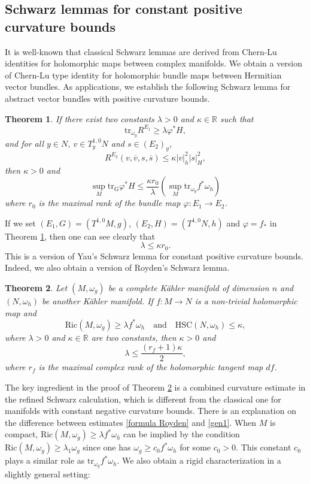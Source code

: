 \documentclass[12pt]{amsart}
\theoremstyle{plain}
\newtheorem{thm}{Theorem}[section]
\theoremstyle{definition}
\newcommand{\btheorem}{\begin{thm}}
\newcommand{\etheorem}{\end{thm}}
\renewcommand{\bar}{\overline}
\renewcommand{\phi}{\varphi}
\newcommand{\beq}{\begin{equation}}
\newcommand{\eeq}{\end{equation}}
\newcommand{\qtq}[1]{\quad\mbox{#1}\quad}
\renewcommand{\>}{\rightarrow}
\newcommand{\R}{{\mathbb R}}
\newcommand{\Ric}{\mathrm{Ric}}
\newcommand{\om}{\omega}
\numberwithin{equation}{section} %
\begin{document}
\baselineskip






\subsection{Schwarz lemmas for constant positive curvature bounds}


\noindent It is well-known that  classical Schwarz lemmas are derived from Chern-Lu identities for holomorphic maps between complex manifolds.  We  obtain a version of Chern-Lu type identity for holomorphic bundle maps between Hermitian vector bundles.  As applications, we  establish the following Schwarz lemma for abstract vector bundles with positive curvature bounds.
\btheorem\label{thm2} If there exist two constants $\lambda>0$ and $\kappa\in \R$ such that
\beq
\mathrm{tr}_{\om_g}R^{E_1}\ge \lambda \phi^*H,
\eeq
and for all $y\in N$, $v\in T_y^{1,0}N$ and $s\in (E_2)_y$,
\beq
R^{E_2}\left(v,\bar v, s,\bar s\right)\le \kappa|v|_h^2|s|_H^2,
\eeq then  $\kappa>0$ and
\beq
\sup_M \mathrm{tr_G}\phi^* H \le \frac{\kappa r_0}{\lambda}\left(\sup_M \mathrm{tr}_{\omega_g} f^*\omega_h\right)
\eeq
where $r_0$ is the maximal rank of the bundle map $\phi: E_1\>E_2$.
\etheorem
\noindent If  we set  $(E_1, G)=\left(T^{1,0}M,g\right)$, $\left(E_2, H\right)=\left(T^{1,0}N,h\right)$ and $\phi= f_*$ in Theorem \ref{thm2}, then one can see clearly that  $$\lambda \leq \kappa r_0.$$
This is a version of Yau's Schwarz lemma for constant positive curvature bounds. Indeed, we also obtain a version of Royden's Schwarz lemma.   \btheorem \label{main00}
Let $(M,\om_g)$ be a complete K\"ahler manifold of dimension $n$
and $(N,\om_h)$ be another K\"ahler manifold.  If  $f:M\to N$ is  a non-trivial holomorphic map and
\beq \Ric(M,\omega_g) \ge \lambda f^*\omega_h\qtq{and} \mathrm{HSC}(N,\omega_h)\leq \kappa,
\label{gen1 condition}
\eeq
where  $\lambda>0$ and $\kappa\in \R$ are two constants, then $\kappa>0$ and
\beq
\lambda\le \frac{\left(r_f+1\right)\kappa}{2},  \label{gen1}
\eeq
where $r_f$ is the maximal complex rank of the holomorphic tangent map $df$.
\etheorem
\noindent The key ingredient in the proof of Theorem \ref{main00} is  a combined curvature estimate in the refined
Schwarz  calculation, which is different from the classical one for manifolds with constant negative curvature bounds.
There is an explanation on the difference between  estimates \eqref{formula Royden} and \eqref{gen1}.
When $M$ is compact, $ \Ric(M,\omega_g) \ge \lambda f^*\omega_h$ can be implied by the condition
$ \Ric(M,\omega_g)\geq \lambda_1 \omega_g$ since one has $\omega_g\geq c_0 f^*\omega_h$ for some $c_0>0$.
This constant $c_0$ plays a similar role  as $\mathrm{tr}_{\omega_g} f^*\omega_h$.
We also obtain a rigid characterization in a slightly general setting:
\end{document}
